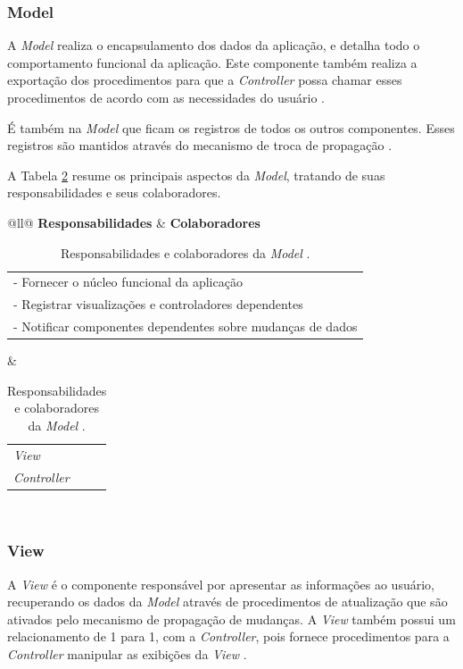\subsubsection{Model}

A \textit{Model} realiza o encapsulamento dos dados da aplicação, e detalha todo o comportamento funcional da aplicação. Este componente também realiza a exportação dos procedimentos para que a \textit{Controller} possa chamar esses procedimentos de acordo com as necessidades do usuário \cite{buschmann1996system}.

É também na \textit{Model} que ficam os registros de todos os outros componentes. Esses registros são mantidos através do mecanismo de troca de propagação \cite{buschmann1996system}. 

A Tabela \ref{responsabilidadeColaboradorModel} resume os principais aspectos da \textit{Model}, tratando de suas responsabilidades e seus colaboradores. 

\begin{table}[h!]
	\centering
	\caption{Responsabilidades e colaboradores da \textit{Model} \cite{buschmann1996system}.}
	\label{responsabilidadeColaboradorModel}
	\begin{tabular}{@{}ll@{}}
		\hline
		\textbf{Responsabilidades} &   \textbf{Colaboradores} \\ \hline
		\begin{tabular}[c]{@{}l@{}}- Fornecer o núcleo funcional da aplicação\\ - Registrar visualizações e controladores dependentes\\ - Notificar componentes dependentes sobre mudanças de dados\end{tabular} & \begin{tabular}[c]{@{}l@{}}\textit{View}\\ \textit{Controller}\end{tabular} \\ \hline
	\end{tabular}
\end{table}

\subsubsection{View}

A \textit{View} é o componente responsável por apresentar as informações ao usuário, recuperando os dados da \textit{Model} através de procedimentos de atualização que são ativados pelo mecanismo de propagação de mudanças. A \textit{View} também possui um relacionamento de 1 para 1, com a \textit{Controller}, pois fornece procedimentos para a \textit{Controller} manipular as exibições da \textit{View} \cite{buschmann1996system}.

